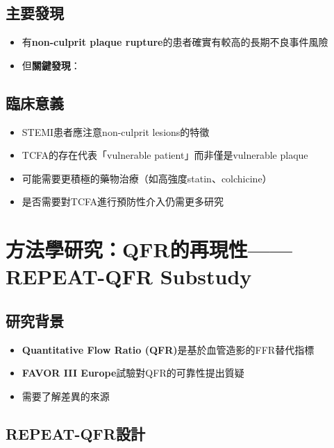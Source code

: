 \documentclass[12pt,a4paper]{article}
\begin{document}
\subsection{主要發現}

\begin{itemize}
    \item 有\textbf{non-culprit plaque rupture}的患者確實有較高的長期不良事件風險
    \item 但\textbf{關鍵發現}：
\end{itemize}


\subsection{臨床意義}

\begin{itemize}
    \item STEMI患者應注意non-culprit lesions的特徵
    \item TCFA的存在代表「vulnerable patient」而非僅是vulnerable plaque
    \item 可能需要更積極的藥物治療（如高強度statin、colchicine）
    \item 是否需要對TCFA進行預防性介入仍需更多研究
\end{itemize}

\section{方法學研究：QFR的再現性——REPEAT-QFR Substudy}

\subsection{研究背景}

\begin{itemize}
    \item \textbf{Quantitative Flow Ratio (QFR)}是基於血管造影的FFR替代指標
    \item \textbf{FAVOR III Europe}試驗對QFR的可靠性提出質疑
    \item 需要了解差異的來源
\end{itemize}

\subsection{REPEAT-QFR設計}
\end{document}
